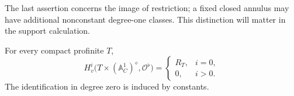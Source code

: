 The last assertion concerns the image of restriction; a fixed
closed annulus may have additional nonconstant degree-one classes.
This distinction will matter in the support calculation.

\begin{lemma}
\label{lem:affine-line-flat}
For every compact profinite \(T\),
\begin{equation}
 H^i_v\bigl(T\times(\mathbb A^1_C)^\diamond,\mathcal O^\flat\bigr)
 =
 \begin{cases}
 R_T,&i=0,\\
 0,&i>0.
 \end{cases}
 \label{eq:analytic-affine-line}
\end{equation}
The identification in degree zero is induced by constants.
\end{lemma}

